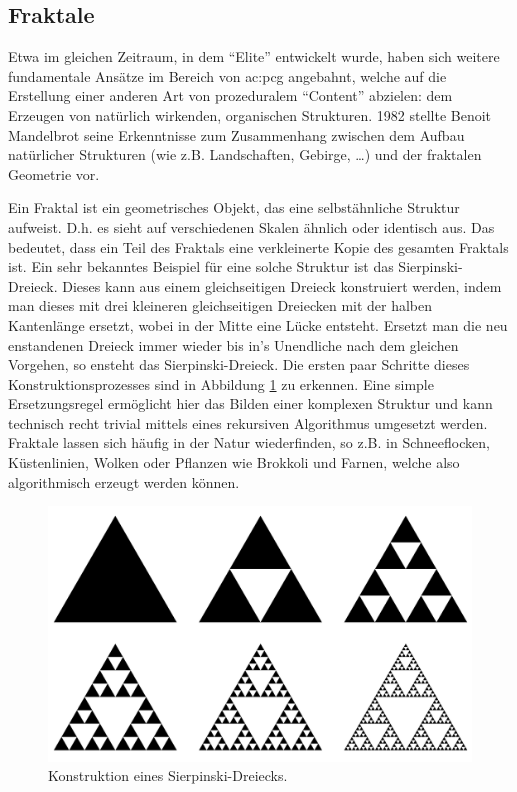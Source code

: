 \subsection{Fraktale}
\label{chap:fraktale}
Etwa im gleichen Zeitraum, in dem ``Elite'' entwickelt wurde, haben sich weitere fundamentale Ansätze im Bereich von \gls{ac:pcg} angebahnt,
welche auf die Erstellung einer anderen Art von prozeduralem ``Content'' abzielen: dem Erzeugen von natürlich wirkenden, organischen Strukturen.
1982 stellte Benoit Mandelbrot seine Erkenntnisse zum Zusammenhang zwischen dem Aufbau natürlicher Strukturen (wie z.B. Landschaften, Gebirge, \dots)
und der fraktalen Geometrie vor. \cite{19_mandelbrot}

Ein Fraktal ist ein geometrisches Objekt, das eine selbstähnliche Struktur aufweist. D.h. es sieht auf verschiedenen Skalen ähnlich oder identisch
aus. Das bedeutet, dass ein Teil des Fraktals eine verkleinerte Kopie des gesamten Fraktals ist. \cite{19_mandelbrot} Ein sehr bekanntes Beispiel
für eine solche Struktur ist das Sierpinski-Dreieck. Dieses kann aus einem gleichseitigen Dreieck konstruiert werden,
indem man dieses mit drei kleineren gleichseitigen Dreiecken mit der halben Kantenlänge ersetzt, wobei in der Mitte eine Lücke entsteht. Ersetzt man
die neu enstandenen Dreieck immer wieder bis in's Unendliche nach dem gleichen Vorgehen, so ensteht das Sierpinski-Dreieck. \cite{37_sierpinski}
Die ersten paar Schritte dieses Konstruktionsprozesses sind in Abbildung \ref{fig:sierpinski_triangle} zu erkennen. Eine simple Ersetzungsregel ermöglicht
hier das Bilden einer komplexen Struktur und kann technisch recht trivial mittels eines rekursiven Algorithmus umgesetzt werden. Fraktale lassen
sich häufig in der Natur wiederfinden, so z.B. in Schneeflocken, Küstenlinien, Wolken oder Pflanzen wie Brokkoli und Farnen, welche also algorithmisch
erzeugt werden können. \cite{19_mandelbrot}

\begin{figure}[t]
    \centering
    \includegraphics[width=(\imgWidth/2)]{images/sierpinski_triangle.pdf}
    \caption{Konstruktion eines Sierpinski-Dreiecks.}
    \label{fig:sierpinski_triangle}
\end{figure}

